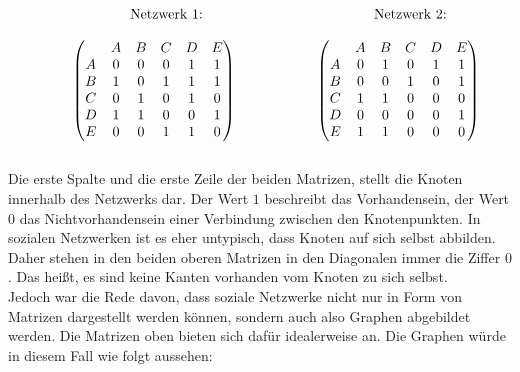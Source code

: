 \[
    \begin{array}{ccc} 
        \text{\hspace{-5.5cm}Netzwerk 1:} & \text{\hspace{-3cm}Netzwerk 2:} \\[\normalbaselineskip]
\begin{pmatrix}
& A & B & C & D & E\\
A & 0 & 0 & 0 & 1 & 1 \\
B & 1 & 0 & 1 & 1 & 1 \\
C & 0 & 1 & 0 & 1 & 0 \\
D & 1 & 1 & 0 & 0 & 1 \\
E & 0 & 0 & 1 & 1 & 0 \\
\end{pmatrix}
\hspace{2cm}
\begin{pmatrix}
& A & B & C & D & E\\
A & 0 & 1 & 0 & 1 & 1 \\
B & 0 & 0 & 1 & 0 & 1 \\
C & 1 & 1 & 0 & 0 & 0 \\
D & 0 & 0 & 0 & 0 & 1 \\
E & 1 & 1 & 0 & 0 & 0 \\
\end{pmatrix}
 \end{array} 
\]
\\
Die erste Spalte und die erste Zeile der beiden Matrizen, stellt die Knoten innerhalb des Netzwerks dar. Der Wert $1$ beschreibt das Vorhandensein, der Wert $0$ das Nichtvorhandensein einer Verbindung zwischen den Knotenpunkten. In sozialen Netzwerken ist es eher untypisch, dass Knoten auf sich selbst abbilden. Daher stehen in den beiden oberen Matrizen in den Diagonalen immer die Ziffer $0$. Das heißt, es sind keine Kanten vorhanden vom Knoten zu sich selbst.\\
Jedoch war die Rede davon, dass soziale Netzwerke nicht nur in Form von Matrizen dargestellt werden können, sondern auch also Graphen abgebildet werden.
Die Matrizen oben bieten sich dafür idealerweise an. 
Die Graphen würde in diesem Fall wie folgt aussehen: 
